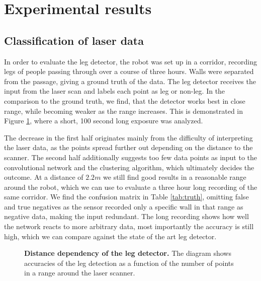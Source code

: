 \section{Experimental results}
\label{sec:Experiment}

\subsection{Classification of laser data}

In order to evaluate the leg detector, the robot was set up in a corridor, recording legs of people passing through over a course of three hours. Walls were separated from the passage, giving a ground truth of the data. The leg detector receives the input from the laser scan and labels each point as leg or non-leg.
In the comparison to the ground truth, we find, that the detector works best in close range, while becoming weaker as the range increases. This is demonstrated in Figure \ref{fig:radius_detection}, where a short, 100 second long exposure was analyzed.

The decrease in the first half originates mainly from the difficulty of interpreting the laser data, as the points spread further out depending on the distance to the scanner. The second half additionally suggests too few data points as input to the convolutional network and the clustering algorithm, which ultimately decides the outcome.
At a distance of $2.2 m$ we still find good results in a reasonable range around the robot, which we can use to evaluate a three hour long recording of the same corridor. We find the confusion matrix in Table \ref{tab:truth}, omitting false and true negatives as the sensor recorded only a specific wall in that range as negative data, making the input redundant. The long recording shows how well the network reacts to more arbitrary data, most importantly the accuracy is still high, which we can compare against the state of the art leg detector.

\begin{figure}
	\normalsize
	\begin{center}
		
	\end{center}
	\caption{\textbf{Distance dependency of the leg detector.} The diagram shows accuracies of the leg detection as a function of the number of points in a range around the laser scanner.}
	\label{fig:radius_detection}
\end{figure}

